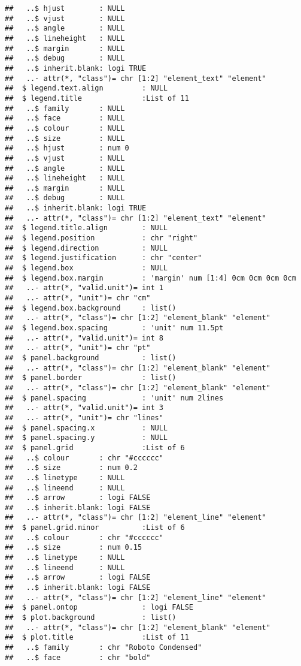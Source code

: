 \documentclass[
]{article}
\begin{document}
\begin{verbatim}
##   ..$ hjust        : NULL
##   ..$ vjust        : NULL
##   ..$ angle        : NULL
##   ..$ lineheight   : NULL
##   ..$ margin       : NULL
##   ..$ debug        : NULL
##   ..$ inherit.blank: logi TRUE
##   ..- attr(*, "class")= chr [1:2] "element_text" "element"
##  $ legend.text.align         : NULL
##  $ legend.title              :List of 11
##   ..$ family       : NULL
##   ..$ face         : NULL
##   ..$ colour       : NULL
##   ..$ size         : NULL
##   ..$ hjust        : num 0
##   ..$ vjust        : NULL
##   ..$ angle        : NULL
##   ..$ lineheight   : NULL
##   ..$ margin       : NULL
##   ..$ debug        : NULL
##   ..$ inherit.blank: logi TRUE
##   ..- attr(*, "class")= chr [1:2] "element_text" "element"
##  $ legend.title.align        : NULL
##  $ legend.position           : chr "right"
##  $ legend.direction          : NULL
##  $ legend.justification      : chr "center"
##  $ legend.box                : NULL
##  $ legend.box.margin         : 'margin' num [1:4] 0cm 0cm 0cm 0cm
##   ..- attr(*, "valid.unit")= int 1
##   ..- attr(*, "unit")= chr "cm"
##  $ legend.box.background     : list()
##   ..- attr(*, "class")= chr [1:2] "element_blank" "element"
##  $ legend.box.spacing        : 'unit' num 11.5pt
##   ..- attr(*, "valid.unit")= int 8
##   ..- attr(*, "unit")= chr "pt"
##  $ panel.background          : list()
##   ..- attr(*, "class")= chr [1:2] "element_blank" "element"
##  $ panel.border              : list()
##   ..- attr(*, "class")= chr [1:2] "element_blank" "element"
##  $ panel.spacing             : 'unit' num 2lines
##   ..- attr(*, "valid.unit")= int 3
##   ..- attr(*, "unit")= chr "lines"
##  $ panel.spacing.x           : NULL
##  $ panel.spacing.y           : NULL
##  $ panel.grid                :List of 6
##   ..$ colour       : chr "#cccccc"
##   ..$ size         : num 0.2
##   ..$ linetype     : NULL
##   ..$ lineend      : NULL
##   ..$ arrow        : logi FALSE
##   ..$ inherit.blank: logi FALSE
##   ..- attr(*, "class")= chr [1:2] "element_line" "element"
##  $ panel.grid.minor          :List of 6
##   ..$ colour       : chr "#cccccc"
##   ..$ size         : num 0.15
##   ..$ linetype     : NULL
##   ..$ lineend      : NULL
##   ..$ arrow        : logi FALSE
##   ..$ inherit.blank: logi FALSE
##   ..- attr(*, "class")= chr [1:2] "element_line" "element"
##  $ panel.ontop               : logi FALSE
##  $ plot.background           : list()
##   ..- attr(*, "class")= chr [1:2] "element_blank" "element"
##  $ plot.title                :List of 11
##   ..$ family       : chr "Roboto Condensed"
##   ..$ face         : chr "bold"

\end{verbatim}
\end{document}
